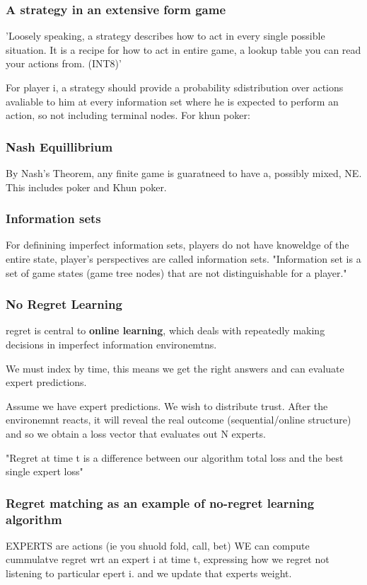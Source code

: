 \documentclass{article}
\begin{document}
\subsubsection{A strategy in an extensive form game}
'Loosely speaking, a strategy describes how to act in every single possible situation. It is a recipe for how to act in entire game, a lookup table you can read your actions from. (INT8)'

For player i, a strategy should provide a probability sdistribution over actions avaliable to him at every information set where he is expected to perform an action, so not including terminal nodes. For khun poker: 


\subsubsection{Nash Equillibrium}
By Nash's Theorem, any finite game is guaratneed to have a, possibly mixed, NE. This includes poker and Khun poker. 

\subsubsection{Information sets}
For definining imperfect information sets, players do not have knoweldge of the entire state, player's perspectives are called information sets. 
"Information set is a set of game states (game tree nodes) that are not distinguishable for a player."

\subsubsection{No Regret Learning}
regret is central to \textbf{online learning}, which deals with repeatedly making decisions in imperfect information environemtns. 

We must index by time, this means we get the right answers and can evaluate expert predictions.

Assume we have expert predictions. We wish to distribute trust. After the environemnt reacts, it will reveal the real outcome (sequential/online structure) and so we obtain a loss vector that evaluates out N experts.

"Regret at time t is a difference between our algorithm total loss and the best single expert loss" 

\subsubsection{Regret matching as an example of no-regret learning algorithm}
EXPERTS are actions (ie you shuold fold, call, bet)
WE can compute cummulatve regret wrt an expert i at time t, expressing how we regret not listening to particular epert i. and we update that experts weight.
\end{document}
